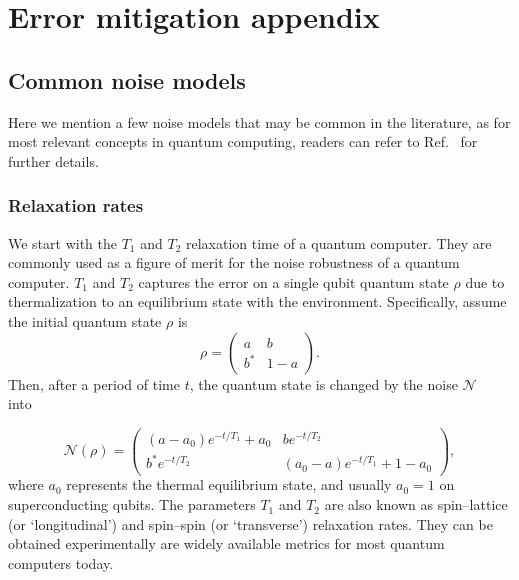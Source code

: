 \section{Error mitigation appendix}
\subsection{Common noise models} \label{sec:common_noise_models}
Here we mention a few noise models that may be common in the literature, as for most relevant concepts in quantum computing, readers can refer to Ref.~\cite{nielsenQuantumComputationQuantum2010} for further details.

\subsubsection{Relaxation rates}
\label{sec:mit-noise-relaxation}

We start with the $T_1$ and $T_2$ relaxation time of a quantum computer. They are commonly used as a figure of merit for the noise robustness of a quantum computer. $T_1$ and $T_2$ captures the error on a single qubit quantum state $\rho$ due to thermalization to an equilibrium state with the environment. Specifically, assume the initial quantum state $\rho$ is
\begin{equation}
    \label{eq:error-mit-noise-model-rho}
    \rho = \begin{pmatrix}
        a     & b   \\
        b^{*} & 1-a
    \end{pmatrix}.
\end{equation}
Then, after a period of time $t$, the quantum state is changed by the noise $\mathcal{N}$ into~\cite{nielsenQuantumComputationQuantum2010}

\begin{equation}
    \mathcal{N}(\rho) = \begin{pmatrix}
        ( a-a_{0}) e^{-t/T_{1}} +a_{0} & be^{-t/T_{2}}                     \\
        b^{*} e^{-t/T_{2}}             & ( a_{0} -a) e^{-t/T_{1}} +1-a_{0}
    \end{pmatrix},
\end{equation}
where $a_{0}$ represents the thermal equilibrium state, and usually $a_{0}=1$ on superconducting qubits.
The parameters $T_{1}$ and $T_2$ are also known as spin–lattice (or `longitudinal') and spin–spin (or `transverse') relaxation rates. They can be obtained experimentally are widely available metrics for most quantum computers today.


